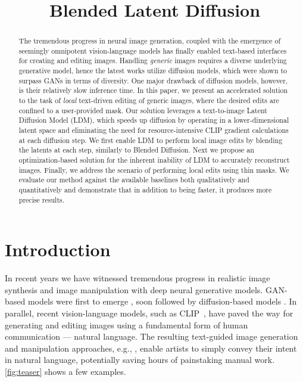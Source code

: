 \title{Blended Latent Diffusion}

\begin{abstract}
The tremendous progress in neural image generation, coupled with the emergence of seemingly omnipotent vision-language models has finally enabled text-based interfaces for creating and editing images. Handling \emph{generic} images requires a diverse underlying generative model, hence the latest works utilize diffusion models, which were shown to surpass GANs in terms of diversity. One major drawback of diffusion models, however, is their relatively slow inference time. In this paper, we present an accelerated solution to the task of \emph{local} text-driven editing of generic images, where the desired edits are confined to a user-provided mask. Our solution leverages a text-to-image Latent Diffusion Model (LDM), which speeds up diffusion by operating in a lower-dimensional latent space and eliminating the need for resource-intensive CLIP gradient calculations at each diffusion step. We first enable LDM to perform local image edits by blending the latents at each step, similarly to Blended Diffusion. Next we propose an optimization-based solution for the inherent inability of LDM to accurately reconstruct images. Finally, we address the scenario of performing local edits using thin masks. We evaluate our method against the available baselines both qualitatively and quantitatively and demonstrate that in addition to being faster, it produces more precise results.
\end{abstract}

\section{Introduction}

In recent years we have witnessed tremendous progress in realistic image synthesis and image manipulation with deep neural generative models. GAN-based models were first to emerge \cite{goodfellow2014gans,brock2018large,karras2019style,karras2020analyzing}, soon followed by diffusion-based models \cite{sohl2015deep, ho2020denoising, nichol2021improved}. In parallel, recent vision-language models, such as CLIP~\cite{radford2021learning}, have paved the way for generating and editing images using a fundamental form of human communication --- natural language. The resulting text-guided image generation and manipulation approaches, e.g., \cite{patashnik2021styleclip,nichol2021glide,ramesh2022hierarchical, saharia2022photorealistic, yu2022scaling, ding2021cogview}, enable artists to simply convey their intent in natural language, potentially saving hours of painstaking manual work. \ref{fig:teaser} shows a few examples.

